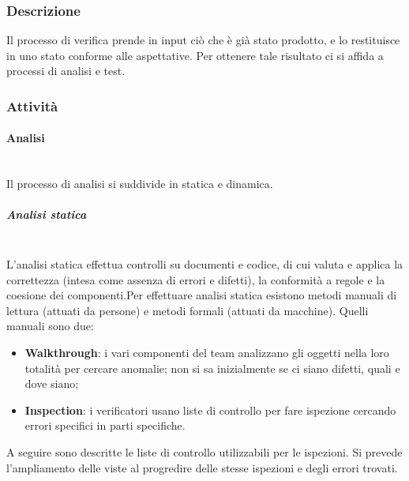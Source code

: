 	\subsubsection{Descrizione}
	Il processo di verifica prende in input ciò che è già stato prodotto, e lo restituisce in uno stato conforme alle aspettative. Per ottenere tale risultato ci si affida a processi di analisi e test.
	\subsubsection{Attività}
		\paragraph{Analisi} \mbox{}\\
		Il processo di analisi si suddivide in statica e dinamica.
			\subparagraph{Analisi statica} \mbox{}\\
			L'analisi statica effettua controlli su documenti e codice, di cui valuta e applica la correttezza (intesa come assenza di errori e difetti), la conformità a regole e la coesione dei componenti.\newline Per effettuare analisi statica esistono metodi manuali di lettura (attuati da persone) e metodi formali (attuati da macchine). Quelli manuali sono due:
			\begin{itemize}
				\item \textbf{Walkthrough}: i vari componenti del team analizzano gli oggetti nella loro totalità per cercare anomalie; non si sa inizialmente se ci siano difetti, quali e dove siano;
				\item \textbf{Inspection}: i verificatori usano liste di controllo per fare ispezione cercando errori specifici in parti specifiche.
			\end{itemize}
			A seguire sono descritte le liste di controllo utilizzabili per le ispezioni. Si prevede l'ampliamento delle viste al progredire delle stesse ispezioni e degli errori trovati.
